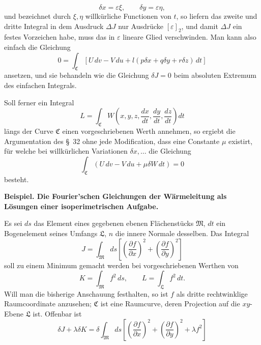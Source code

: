 \documentclass[11pt,a4paper,leqno]{article}
\begin{document}
\[
\delta x=\varepsilon\xi,\qquad \delta y=\varepsilon\eta,
\]
und bezeichnet durch $\xi,\eta$ willkürliche Functionen von $t$, so liefern
das zweite und dritte Integral in dem Ausdruck $\Delta J$ nur Ausdrücke
$[\varepsilon]_2$, und damit $\Delta J$ ein festes Vorzeichen habe, muss das
in $\varepsilon$ lineare Glied verschwinden. Man kann also einfach die
Gleichung
\begin{equation}\tag{15}
0=\int_{\mathfrak{C}}
[U\,dv-V\,du+l(p\delta x+q\delta y+r\delta z)\,dt]
\end{equation}
ansetzen, und sie behandeln wie die Gleichung $\delta J=0$ beim absoluten
Extremum des einfachen Integrals.

Soll ferner ein Integral
\[
L=\int_{\mathfrak{C}}
W\left(x,y,z,\frac{dx}{dt},\frac{dy}{dt},\frac{dz}{dt}\right)dt
\]
längs der Curve $\mathfrak{C}$ einen vorgeschriebenen Werth annehmen, so
ergiebt die Argumentation des \S~32 ohne jede Modification, dass eine Constante
$\mu$ existirt, für welche bei willkürlichen Variationen $\delta x,\ldots$ die
Gleichung
\[
\int_{\mathfrak{C}}(U\,dv-V\,du+\mu\delta W\,dt)=0
\]
besteht.

\begin{center}
\textbf{Beispiel. Die Fourier'schen Gleichungen der Wärmeleitung als Lösungen
einer isoperimetrischen Aufgabe.}
\end{center}

Es sei $ds$ das Element eines gegebenen ebenen Flächenstücks $\mathfrak{M}$,
$dt$ ein Bogenelement seines Umfangs $\mathfrak{L}$, $n$ die innere Normale
desselben. Das Integral
\[
J=\int_{\mathfrak{M}}ds
\left[\left(\frac{\partial f}{\partial x}\right)^2
+\left(\frac{\partial f}{\partial y}\right)^2\right]
\]
soll zu einem Minimum gemacht werden bei vorgeschriebenen Werthen von
\[
K=\int_{\mathfrak{M}}f^2\,ds,\qquad
L=\int_{\mathfrak{L}}f^2\,dt.
\]
Will man die bisherige Anschauung festhalten, so ist $f$ als dritte
rechtwinklige Raumcoordinate anzusehen; $\mathfrak{C}$ ist eine Raumcurve,
deren Projection auf die $xy$-Ebene $\mathfrak{L}$ ist. Offenbar ist
\[
\delta J+\lambda\delta K
=\delta\int_{\mathfrak{M}}ds
\left[\left(\frac{\partial f}{\partial x}\right)^2
+\left(\frac{\partial f}{\partial y}\right)^2+\lambda f^2\right]
\]
\end{document}
